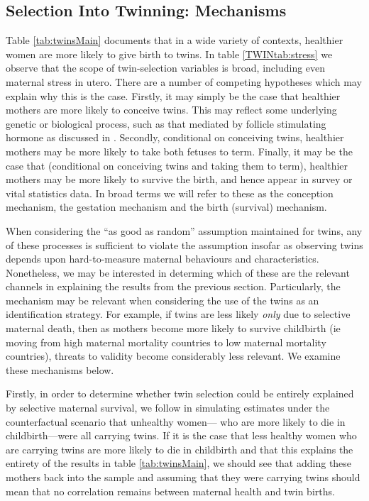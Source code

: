 \documentclass[subeqn]{article}
\begin{document}
\begin{spacing}{1.4}
\subsection{Selection Into Twinning: Mechanisms}   \label{TWINsscn:selection}
Table \ref{tab:twinsMain} documents that in a wide variety of contexts,
healthier women are more likely to give birth to twins.  In table
\ref{TWINtab:stress} we observe that the scope of twin-selection variables is
broad, including even maternal stress in utero.  There are a number of competing
hypotheses which may explain why this is the case.  Firstly, it may simply be
the case that healthier mothers are more likely to conceive twins.  This may
reflect some underlying genetic or biological process, 
such as that mediated by follicle stimulating hormone as discussed in 
\citet{Hall2003}.  Secondly, conditional on conceiving twins, healthier mothers 
may be more likely to take both fetuses to term.  Finally, it may be the case 
that (conditional on conceiving twins and taking them to term), healthier mothers 
may be more likely to survive the birth, and hence appear in survey or vital 
statistics data.  In broad terms we will refer to these as the conception 
mechanism, the gestation mechanism and the birth (survival) mechanism.

When considering the ``as good as random'' assumption maintained for twins, any
of these processes is sufficient to violate the assumption insofar as observing
twins depends upon hard-to-measure maternal behaviours and characteristics.
Nonetheless, we may be interested in determing which of these are the relevant
channels in explaining the results from the previous section.  Particularly, the
mechanism may be relevant when considering the use of the twins as an
identification strategy.  For example, if twins are less likely \emph{only} due
to selective maternal death, then as mothers become more likely to survive
childbirth (ie moving from high maternal mortality countries to low maternal
mortality countries), threats to validity become considerably less relevant.
We examine these mechanisms below.

Firstly, in order to determine whether twin selection could be entirely
explained by selective maternal survival, we follow \citet{Aldermanetal2011} in
simulating estimates under the counterfactual scenario that unhealthy women---%
who are more likely to die in childbirth---were all carrying twins.  If it is
the case that less healthy women who are carrying twins are more likely to die
in childbirth and that this explains the entirety of the results in table
\ref{tab:twinsMain}, we should see that adding these mothers back into the
sample and assuming that they were carrying twins should mean that no
correlation remains between maternal health and twin births.


\end{spacing}
\end{document}
